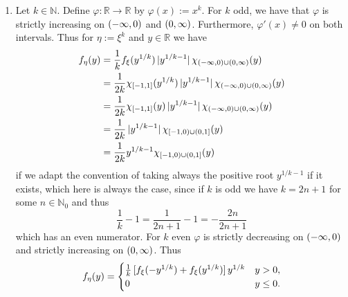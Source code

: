 \begin{enumerate}[label = \textbf{Exercise \arabic*.},wide = 0pt, itemsep=1.5ex]		
	\item Let $k \in \mathbb{N}$. Define $\varphi: \mathbb{R} \to \mathbb{R}$ by $\varphi(x) := x^k$. For $k$ odd, we have that $\varphi$ is strictly increasing on $\intoo{-\infty,0}$ and $\intoo{0,\infty}$. Furthermore, $\varphi'(x) \neq 0$ on both intervals. Thus for $\eta := \xi^k$ and $y \in \mathbb{R}$ we have
		\begin{align*}
			f_\eta(y) &= \frac{1}{k}f_\xi(y^{1/k})\abs[0]{y^{1/k - 1}}\chi_{\intoo{-\infty,0} \cup \intoo{0,\infty}}(y)\\
			&= \frac{1}{2k}\chi_{\intcc{-1,1}}(y^{1/k})\abs[0]{y^{1/k - 1}}\chi_{\intoo{-\infty,0} \cup \intoo{0,\infty}}(y)\\
			&= \frac{1}{2k}\chi_{\intcc{-1,1}}(y)\abs[0]{y^{1/k - 1}}\chi_{\intoo{-\infty,0} \cup \intoo{0,\infty}}(y)\\
			&= \frac{1}{2k}\abs[0]{y^{1/k - 1}}\chi_{\intco{-1,0} \cup \intoc{0,1}}(y)\\
			&= \frac{1}{2k}y^{1/k - 1}\chi_{\intco{-1,0} \cup \intoc{0,1}}(y)
		\end{align*}
		\noindent if we adapt the convention of taking always the positive root $y^{1/k - 1}$ if it exists, which here is always the case, since if $k$ is odd we have $k = 2n + 1$ for some $n \in \mathbb{N}_0$ and thus 
		\begin{equation}
			\frac{1}{k} - 1 = \frac{1}{2n + 1} - 1 = -\frac{2n}{2n + 1}
		\end{equation}
		\noindent which has an even numerator. For $k$ even $\varphi$ is strictly decreasing on $\intoo{-\infty,0}$ and strictly increasing on $\intoo{0,\infty}$. Thus
		\begin{align*}
			f_\eta(y) = \begin{cases}
				\frac{1}{k}\sbr[0]{f_\xi(-y^{1/k}) + f_\xi(y^{1/k})}y^{1/k} & y > 0,\\
				0 & y \leq 0.
			\end{cases}
		\end{align*}


\end{enumerate}
